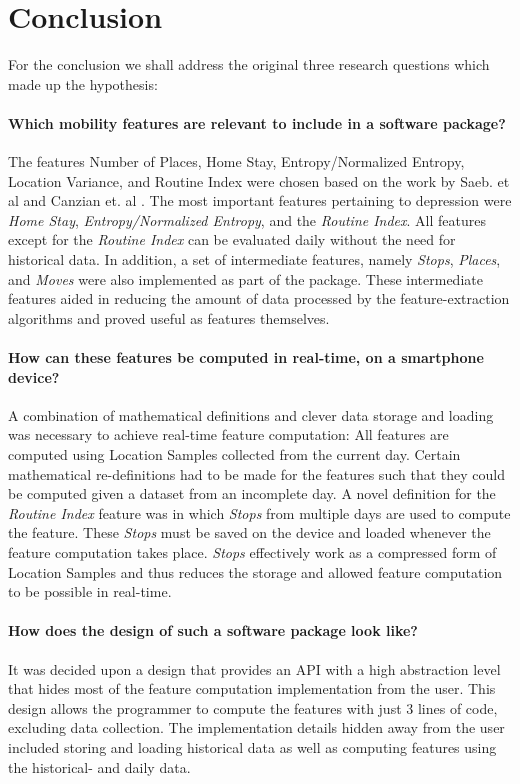 \chapter{Conclusion}
\label{chapter:08}

For the conclusion we shall address the original three research questions which made up the hypothesis:

\subsubsection*{Which mobility features are relevant to include in a software package?}
The features Number of Places, Home Stay, Entropy/Normalized Entropy, Location Variance, and Routine Index were chosen based on the work by Saeb. et al \cite{Saeb2015} and Canzian et. al \cite{Canzian2015}. The most important features pertaining to depression were \textit{Home Stay}, \textit{Entropy/Normalized Entropy}, and the \textit{Routine Index}. All features except for the \textit{Routine Index} can be evaluated daily without the need for historical data. In addition, a set of intermediate features, namely \textit{Stops}, \textit{Places}, and \textit{Moves} were also implemented as part of the package. These intermediate features aided in reducing the amount of data processed by the feature-extraction algorithms and proved useful as features themselves.

\subsubsection*{How can these features be computed in real-time, on a smartphone device?}
A combination of mathematical definitions and clever data storage and loading was necessary to achieve real-time feature computation: All features are computed using Location Samples collected from the current day. Certain mathematical re-definitions had to be made for the features such that they could be computed given a dataset from an incomplete day. A novel definition for the \textit{Routine Index} feature was in which \textit{Stops} from multiple days are used to compute the feature. These \textit{Stops} must be saved on the device and loaded whenever the feature computation takes place. \textit{Stops} effectively work as a compressed form of Location Samples and thus reduces the storage and allowed feature computation to be possible in real-time.

\subsubsection*{How does the design of such a software package look like?}
It was decided upon a design that provides an API with a high abstraction level that hides most of the feature computation implementation from the user. This design allows the programmer to compute the features with just 3 lines of code, excluding data collection. The implementation details hidden away from the user included storing and loading historical data as well as computing features using the historical- and daily data. 

